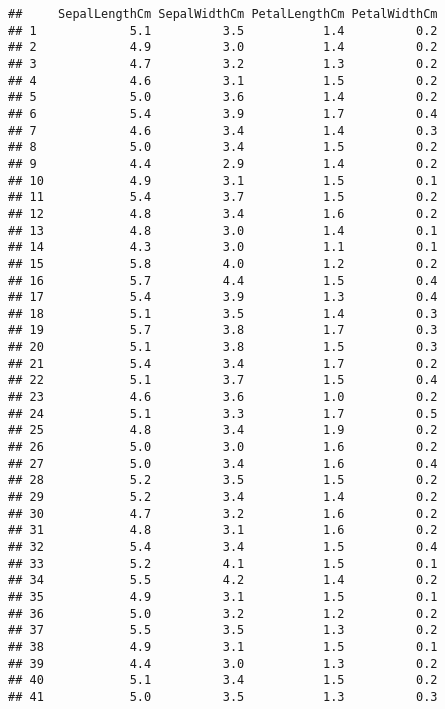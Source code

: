 \documentclass[
]{article}
\begin{document}
\begin{verbatim}
##     SepalLengthCm SepalWidthCm PetalLengthCm PetalWidthCm
## 1             5.1          3.5           1.4          0.2
## 2             4.9          3.0           1.4          0.2
## 3             4.7          3.2           1.3          0.2
## 4             4.6          3.1           1.5          0.2
## 5             5.0          3.6           1.4          0.2
## 6             5.4          3.9           1.7          0.4
## 7             4.6          3.4           1.4          0.3
## 8             5.0          3.4           1.5          0.2
## 9             4.4          2.9           1.4          0.2
## 10            4.9          3.1           1.5          0.1
## 11            5.4          3.7           1.5          0.2
## 12            4.8          3.4           1.6          0.2
## 13            4.8          3.0           1.4          0.1
## 14            4.3          3.0           1.1          0.1
## 15            5.8          4.0           1.2          0.2
## 16            5.7          4.4           1.5          0.4
## 17            5.4          3.9           1.3          0.4
## 18            5.1          3.5           1.4          0.3
## 19            5.7          3.8           1.7          0.3
## 20            5.1          3.8           1.5          0.3
## 21            5.4          3.4           1.7          0.2
## 22            5.1          3.7           1.5          0.4
## 23            4.6          3.6           1.0          0.2
## 24            5.1          3.3           1.7          0.5
## 25            4.8          3.4           1.9          0.2
## 26            5.0          3.0           1.6          0.2
## 27            5.0          3.4           1.6          0.4
## 28            5.2          3.5           1.5          0.2
## 29            5.2          3.4           1.4          0.2
## 30            4.7          3.2           1.6          0.2
## 31            4.8          3.1           1.6          0.2
## 32            5.4          3.4           1.5          0.4
## 33            5.2          4.1           1.5          0.1
## 34            5.5          4.2           1.4          0.2
## 35            4.9          3.1           1.5          0.1
## 36            5.0          3.2           1.2          0.2
## 37            5.5          3.5           1.3          0.2
## 38            4.9          3.1           1.5          0.1
## 39            4.4          3.0           1.3          0.2
## 40            5.1          3.4           1.5          0.2
## 41            5.0          3.5           1.3          0.3

\end{verbatim}
\end{document}
